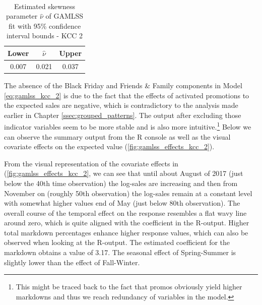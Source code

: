 \begin{table}[H]
\setlength\arrayrulewidth{1pt}  
\centering
\begin{adjustbox}{max width=\textwidth}\
\begin{tabular}{|c|c|c|}
\hline
\rowcolor{lightgray} 
Lower & $\hat{\nu}$ & Upper \\ \hline
0.007        & 0.021           & 0.037        \\ \hline
\end{tabular}
\end{adjustbox}
\caption{Estimated skewness parameter $\hat{\nu}$ of GAMLSS fit with 95\% confidence interval bounds - KCC 2}
\label{tab:nu_ci_kcc_2}
\end{table}



The absence of the Black Friday and Friends \& Family components in Model \ref{eq:gamlss_kcc_2} is due to the fact that the effects of activated promotions to the expected sales are negative, which is contradictory to the analysis made earlier in Chapter \ref{ssec:grouped_patterns}. The output after excluding those indicator variables seem to be more stable and is also more intuitive.\footnote{This might be traced back to the fact that promos obviously yield higher markdowns and thus we reach redundancy of variables in the model.} Below we can observe the summary output from the R console as well as the visual covariate effects on the expected value (\autoref{fig:gamlss_effects_kcc_2}).
\\






From the visual representation of the covariate effects in (\autoref{fig:gamlss_effects_kcc_2}, we can see that until about August of 2017 (just below the 40th time observation) the log-sales are increasing and then from November on (roughly 50th observation) the log-sales remain at a constant level with somewhat higher values end of May (just below 80th observation). The overall course of the temporal effect on the response resembles a flat wavy line around zero, which is quite aligned with the coefficient in the R-output. Higher total markdown percentages enhance higher response values, which can also be observed when looking at the R-output. The estimated coefficient for the markdown obtains a value of 3.17. The seasonal effect of Spring-Summer is slightly lower than the effect of Fall-Winter. 
\\



